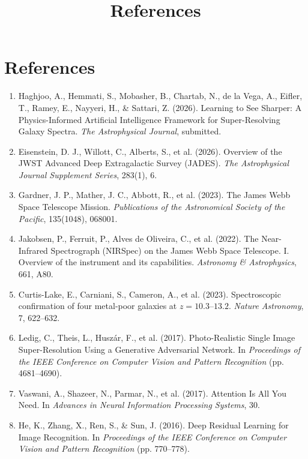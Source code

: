 \documentclass[12pt]{article}
\title{\textbf{References}}
\author{}
\date{}
\begin{document}
\section*{References}

\small

\begin{enumerate}

\item Haghjoo, A., Hemmati, S., Mobasher, B., Chartab, N., de la Vega, A., Eifler, T., Ramey, E., Nayyeri, H., \& Sattari, Z. (2026). Learning to See Sharper: A Physics-Informed Artificial Intelligence Framework for Super-Resolving Galaxy Spectra. \textit{The Astrophysical Journal}, submitted.

\item Eisenstein, D. J., Willott, C., Alberts, S., et al. (2026). Overview of the JWST Advanced Deep Extragalactic Survey (JADES). \textit{The Astrophysical Journal Supplement Series}, 283(1), 6.

\item Gardner, J. P., Mather, J. C., Abbott, R., et al. (2023). The James Webb Space Telescope Mission. \textit{Publications of the Astronomical Society of the Pacific}, 135(1048), 068001.

\item Jakobsen, P., Ferruit, P., Alves de Oliveira, C., et al. (2022). The Near-Infrared Spectrograph (NIRSpec) on the James Webb Space Telescope. I. Overview of the instrument and its capabilities. \textit{Astronomy \& Astrophysics}, 661, A80.

\item Curtis-Lake, E., Carniani, S., Cameron, A., et al. (2023). Spectroscopic confirmation of four metal-poor galaxies at $z = 10.3$--$13.2$. \textit{Nature Astronomy}, 7, 622--632.

\item Ledig, C., Theis, L., Husz\'ar, F., et al. (2017). Photo-Realistic Single Image Super-Resolution Using a Generative Adversarial Network. In \textit{Proceedings of the IEEE Conference on Computer Vision and Pattern Recognition} (pp. 4681--4690).

\item Vaswani, A., Shazeer, N., Parmar, N., et al. (2017). Attention Is All You Need. In \textit{Advances in Neural Information Processing Systems}, 30.

\item He, K., Zhang, X., Ren, S., \& Sun, J. (2016). Deep Residual Learning for Image Recognition. In \textit{Proceedings of the IEEE Conference on Computer Vision and Pattern Recognition} (pp. 770--778).


\end{enumerate}
\end{document}

